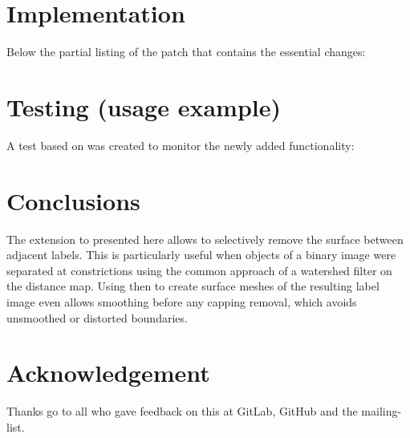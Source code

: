 \documentclass{InsightArticle}
\begin{document}
\section{Implementation}
\label{sec:impl}


Below the partial listing of the patch that contains the essential changes:




\section{Testing (usage example)}
\label{sec:test}


A test based on  was created to monitor the newly added functionality:




\section{Conclusions}

The extension to  presented here allows to selectively remove the surface between adjacent labels.
This is particularly useful when objects of a binary image were separated at constrictions using the common approach of a watershed filter on the distance map.
Using  then to create surface meshes of the resulting label image even allows smoothing before any capping removal, which avoids unsmoothed or distorted boundaries.



\section{Acknowledgement}

Thanks go to all who gave feedback on this at GitLab, GitHub and the mailing-list.
\end{document}
